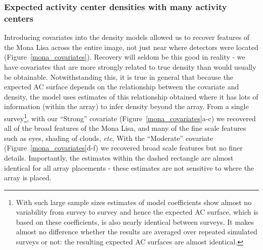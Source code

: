 \documentclass[10pt,a4paper]{article}
\begin{document}


\subsubsection{Expected activity center densities with many activity centers}

Introducing covariates into the density models allowed us to recover features of the Mona Lisa across the entire image, not just near where detectors were located (Figure~\ref{mona_covariates}). Recovery will seldom be this good in reality - we have covariates that are more strongly related to true density than would usually be obtainable. Notwithstanding this, it is true in general that because the expected AC surface depends on the relationship between the covariate and density, the model uses estimates of this relationship obtained where it has lots of information (within the array) to infer density beyond the array. From a single survey\footnote{With such large sample sizes estimates of model coefficients show almost no variability from survey to survey and hence the expected AC surface, which is based on these coefficients, is also nearly identical between surveys. It makes almost no difference whether the results are averaged over repeated simulated surveys or not: the resulting expected AC surfaces are almost identical.}, with our ``Strong'' covariate (Figure~\ref{mona_covariates}a-c) we recovered all of the broad features of the Mona Lisa, and many of the fine scale features such as eyes, shading of clouds, {\it etc}. With the ``Moderate'' covariate (Figure~\ref{mona_covariates}d-f) we recovered broad scale features but no finer details. Importantly, the estimates within the dashed rectangle are almost identical for all array placements - these estimates are not sensitive to where the array is placed.
\end{document}
